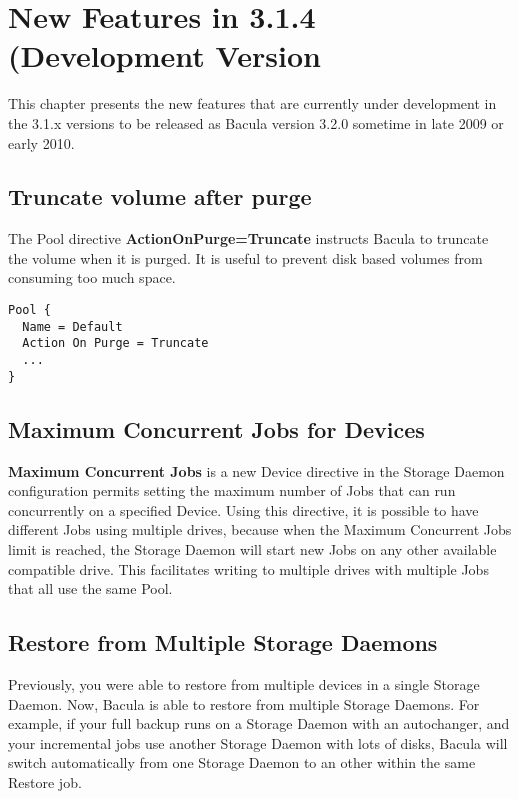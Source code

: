 

\chapter{New Features in 3.1.4 (Development Version}
\label{NewFeaturesChapter}

This chapter presents the new features that are currently under development
in the 3.1.x versions to be released as Bacula version 3.2.0 sometime in
late 2009 or early 2010.

\section{Truncate volume after purge}
\label{sec:actiononpurge}

The Pool directive \textbf{ActionOnPurge=Truncate} instructs Bacula to truncate
the volume when it is purged. It is useful to prevent disk based volumes from
consuming too much space. 

\begin{verbatim}
Pool {
  Name = Default
  Action On Purge = Truncate
  ...
}
\end{verbatim}

\section{Maximum Concurrent Jobs for Devices}
\label{sec:maximumconcurrentjobdevice}

{\bf Maximum Concurrent Jobs} is a new Device directive in the Storage
Daemon configuration permits setting the maximum number of Jobs that can
run concurrently on a specified Device.  Using this directive, it is
possible to have different Jobs using multiple drives, because when the
Maximum Concurrent Jobs limit is reached, the Storage Daemon will start new
Jobs on any other available compatible drive.  This facilitates writing to
multiple drives with multiple Jobs that all use the same Pool.

\section{Restore from Multiple Storage Daemons}

Previously, you were able to restore from multiple devices in a single Storage
Daemon. Now, Bacula is able to restore from multiple Storage Daemons. For
example, if your full backup runs on a Storage Daemon with an autochanger, and
your incremental jobs use another Storage Daemon with lots of disks, Bacula
will switch automatically from one Storage Daemon to an other within the same
Restore job.

